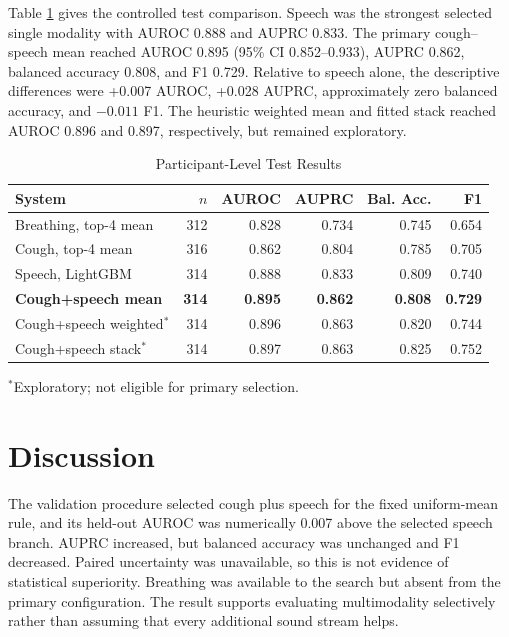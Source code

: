 \documentclass[conference]{IEEEtran}
\begin{document}
Table \ref{tab:results} gives the controlled test comparison. Speech was the
strongest selected single modality with AUROC 0.888 and AUPRC 0.833. The
primary cough--speech mean reached AUROC 0.895 (95\% CI 0.852--0.933), AUPRC
0.862, balanced accuracy 0.808, and F1 0.729. Relative to speech alone, the
descriptive differences were +0.007 AUROC, +0.028 AUPRC, approximately zero
balanced accuracy, and $-0.011$ F1. The heuristic weighted mean and fitted
stack reached AUROC 0.896 and 0.897, respectively, but remained exploratory.

\begin{table}[!t]
\caption{Participant-Level Test Results}
\label{tab:results}
\centering
\footnotesize
\setlength{\tabcolsep}{3.2pt}
\begin{tabular}{lrrrrr}
\toprule
System & $n$ & AUROC & AUPRC & Bal. Acc. & F1 \\
\midrule
Breathing, top-4 mean & 312 & 0.828 & 0.734 & 0.745 & 0.654 \\
Cough, top-4 mean     & 316 & 0.862 & 0.804 & 0.785 & 0.705 \\
Speech, LightGBM      & 314 & 0.888 & 0.833 & 0.809 & 0.740 \\
\midrule
\textbf{Cough+speech mean} & \textbf{314} & \textbf{0.895} & \textbf{0.862} & \textbf{0.808} & \textbf{0.729} \\
Cough+speech weighted$^*$ & 314 & 0.896 & 0.863 & 0.820 & 0.744 \\
Cough+speech stack$^*$    & 314 & 0.897 & 0.863 & 0.825 & 0.752 \\
\bottomrule
\end{tabular}
\par\vspace{1pt}\scriptsize $^*$Exploratory; not eligible for primary selection.
\end{table}

\section{Discussion}

The validation procedure selected cough plus speech for the fixed uniform-mean
rule, and its held-out AUROC was numerically 0.007 above the selected speech
branch. AUPRC increased, but balanced accuracy was unchanged and F1 decreased.
Paired uncertainty was unavailable, so this is not evidence of statistical
superiority. Breathing was available to the search but absent from the primary
configuration. The result supports evaluating multimodality selectively rather
than assuming that every additional sound stream helps.
\end{document}
